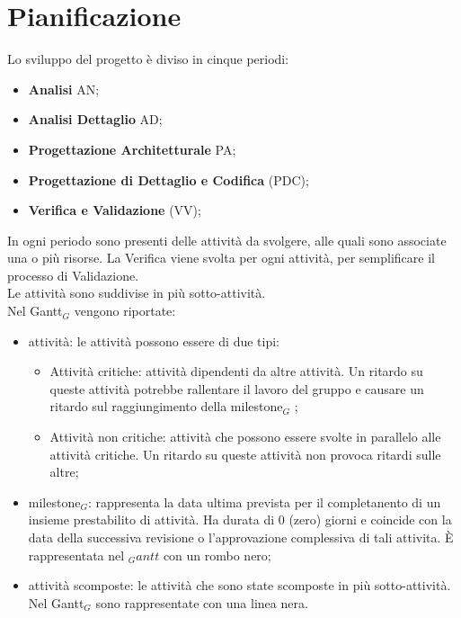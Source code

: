 \chapter{Pianificazione}
Lo sviluppo del progetto è diviso in cinque periodi:
\begin{itemize}
    \item \textbf{Analisi} AN;
    \item \textbf{Analisi Dettaglio} AD;
    \item \textbf{Progettazione Architetturale} PA;
    \item \textbf{Progettazione di Dettaglio e Codifica} (PDC);
    \item \textbf{Verifica e Validazione} (VV);
\end{itemize}
In ogni periodo sono presenti delle attività da svolgere, alle quali sono associate una o più risorse. La Verifica viene svolta per ogni attività, per semplificare il processo di Validazione.\\
Le attività sono suddivise in più sotto-attività.\\
Nel Gantt$_{G}$ vengono riportate:
\begin{itemize}
    \item attività: le attività possono essere di due tipi:
    \begin{itemize}
        \item Attività critiche: attività dipendenti da altre attività. Un ritardo su queste attività potrebbe rallentare il lavoro del gruppo e causare un ritardo sul raggiungimento della milestone$_{G}$ ;
        \item Attività non critiche: attività che possono essere svolte in parallelo alle attività critiche. Un ritardo su queste attività non provoca ritardi sulle altre;
    \end{itemize}
    \item milestone$_{G}$: rappresenta la data ultima prevista per il completanento di un insieme prestabilito di attività. Ha durata di 0 (zero) giorni e coincide con la data della successiva revisione o l'approvazione complessiva di tali attivita. È rappresentata nel $_Gantt$ con un rombo nero;
    \item attività scomposte: le attività che sono state scomposte in più sotto-attività. Nel Gantt$_{G}$ sono rappresentate con una linea nera. 
\end{itemize}
